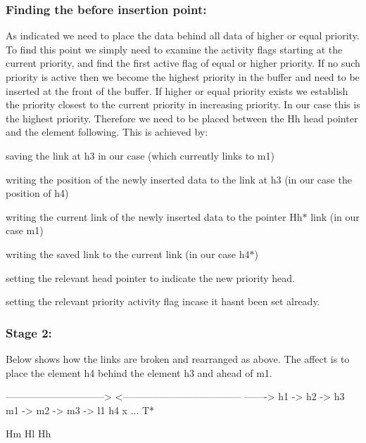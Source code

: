 \subsubsection*{Finding the before insertion point\+:}

As indicated we need to place the data behind all data of higher or equal priority. To find this point we simply need to examine the activity flags starting at the current priority, and find the first active flag of equal or higher priority. If no such priority is active then we become the highest priority in the buffer and need to be inserted at the front of the buffer. If higher or equal priority exists we establish the priority closest to the current priority in increasing priority. In our case this is the highest priority. Therefore we need to be placed between the Hh head pointer and the element following. This is achieved by\+:


\begin{DoxyEnumerate}
\item saving the link at h3 in our case (which currently links to m1)
\item writing the position of the newly inserted data to the link at h3 (in our case the position of h4)
\item writing the current link of the newly inserted data to the pointer Hh$\ast$ link (in our case m1)
\item writing the saved link to the current link (in our case h4$\ast$)
\item setting the relevant head pointer to indicate the new priority head.
\item setting the relevant priority activity flag incase it hasn\textquotesingle{}t been set already.
\end{DoxyEnumerate}

\subsubsection*{Stage 2\+:}

Below shows how the links are broken and rearranged as above. The affect is to place the element h4 behind the element h3 and ahead of m1.


\begin{DoxyCode}
                    ------------------------------>
                      <------------------------------------
                                                    ------->
h1  ->  h2  ->  h3     m1  ->  m2  ->  m3  ->  l1      h4      x  ...
T*
\end{DoxyCode}
 Hm Hl Hh

